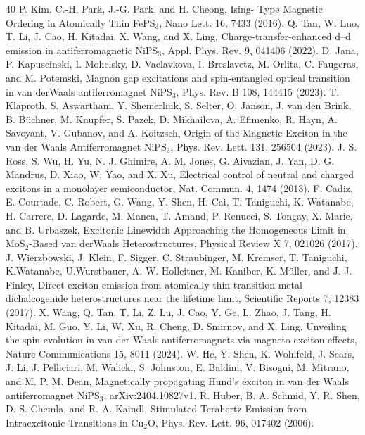 \documentclass[
 reprint,
superscriptaddress,

 amsmath,amssymb,
 aps,

]{revtex4-2}
\begin{document}
\begin{thebibliography}{40}
P. Kim, C.-H. Park, J.-G. Park, and H. Cheong, Ising-
Type Magnetic Ordering in Atomically Thin FePS$_3$,
Nano Lett. 16, 7433 (2016).
Q. Tan, W. Luo, T. Li, J. Cao, H. Kitadai, X. Wang, and
X. Ling, Charge-transfer-enhanced d–d emission in antiferromagnetic
NiPS$_3$, Appl. Phys. Rev. 9, 041406 (2022).
D. Jana, P. Kapuscinski, I. Mohelsky, D. Vaclavkova,
I. Breslavetz, M. Orlita, C. Faugeras, and M. Potemski,
Magnon gap excitations and spin-entangled optical
transition in van derWaals antiferromagnet NiPS$_3$, Phys.
Rev. B 108, 144415 (2023).
T. Klaproth, S. Aswartham, Y. Shemerliuk, S. Selter, O. Janson, J. van den Brink, B. B\"{u}chner, M. Knupfer,
S. Pazek, D. Mikhailova, A. Efimenko, R. Hayn,
A. Savoyant, V. Gubanov, and A. Koitzsch, Origin of the
Magnetic Exciton in the van der Waals Antiferromagnet
NiPS$_3$, Phys. Rev. Lett. 131, 256504 (2023).
J. S. Ross, S. Wu, H. Yu, N. J. Ghimire, A. M. Jones,
G. Aivazian, J. Yan, D. G. Mandrus, D. Xiao, W. Yao,
and X. Xu, Electrical control of neutral and charged excitons
in a monolayer semiconductor, Nat. Commun. 4,
1474 (2013).
F. Cadiz, E. Courtade, C. Robert, G. Wang, Y. Shen,
H. Cai, T. Taniguchi, K. Watanabe, H. Carrere, D. Lagarde,
M. Manca, T. Amand, P. Renucci, S. Tongay,
X. Marie, and B. Urbaszek, Excitonic Linewidth Approaching
the Homogeneous Limit in MoS$_2$-Based van
derWaals Heterostructures, Physical Review X 7, 021026
(2017).
J. Wierzbowski, J. Klein, F. Sigger, C. Straubinger,
M. Kremser, T. Taniguchi, K.Watanabe, U.Wurstbauer,
A. W. Holleitner, M. Kaniber, K. M\"{u}ller, and J. J. Finley,
Direct exciton emission from atomically thin transition
metal dichalcogenide heterostructures near the lifetime
limit, Scientific Reports 7, 12383 (2017).
X. Wang, Q. Tan, T. Li, Z. Lu, J. Cao, Y. Ge, L. Zhao, J. Tang, H. Kitadai, M. Guo, Y. Li, W. Xu, R. Cheng, D. Smirnov, and X. Ling, Unveiling the spin evolution in van der Waals antiferromagnets via magneto-exciton effects,
Nature Communications 15, 8011 (2024).
W. He, Y. Shen, K. Wohlfeld, J. Sears, J. Li, J. Pelliciari,
M. Walicki, S. Johnston, E. Baldini, V. Bisogni,
M. Mitrano, and M. P. M. Dean, Magnetically propagating
Hund’s exciton in van der Waals antiferromagnet
NiPS$_3$, arXiv:2404.10827v1.
R. Huber, B. A. Schmid, Y. R. Shen, D. S. Chemla, and
R. A. Kaindl, Stimulated Terahertz Emission from Intraexcitonic
Transitions in Cu$_2$O, Phys. Rev. Lett. 96,
017402 (2006).

\end{thebibliography}
\end{document}
